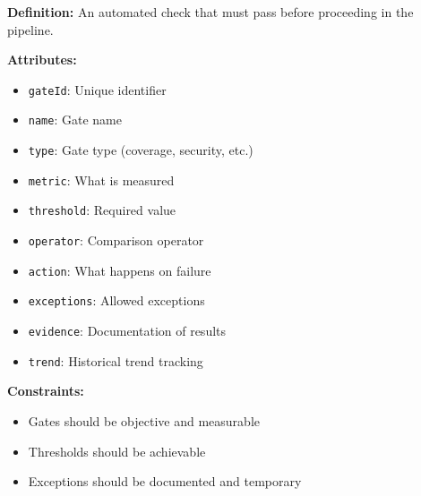 \documentclass[11pt,letterpaper]{article}
\begin{document}
\begin{definitionbox}
\textbf{Definition:} An automated check that must pass before proceeding in the pipeline.

\textbf{Attributes:}
\begin{itemize}[nosep]
    \item \texttt{gateId}: Unique identifier
    \item \texttt{name}: Gate name
    \item \texttt{type}: Gate type (coverage, security, etc.)
    \item \texttt{metric}: What is measured
    \item \texttt{threshold}: Required value
    \item \texttt{operator}: Comparison operator
    \item \texttt{action}: What happens on failure
    \item \texttt{exceptions}: Allowed exceptions
    \item \texttt{evidence}: Documentation of results
    \item \texttt{trend}: Historical trend tracking
\end{itemize}

\textbf{Constraints:}
\begin{itemize}[nosep]
    \item Gates should be objective and measurable
    \item Thresholds should be achievable
    \item Exceptions should be documented and temporary
\end{itemize}
\end{definitionbox}
\end{document}
